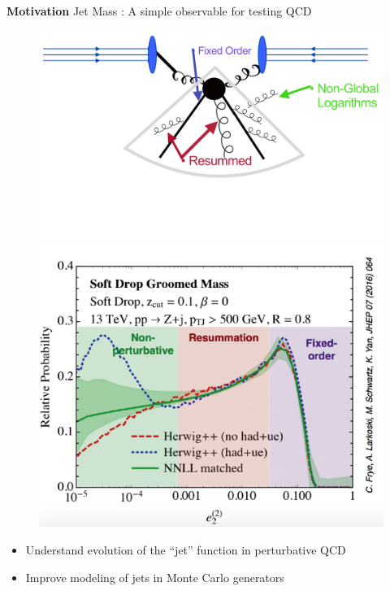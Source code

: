 \documentclass{beamer}
\begin{document}
\begin{frame}{\textbf{Motivation}}
\vspace{.9mm}
\centering
Jet Mass : A simple observable for testing QCD
\begin{figure}
\centering
\includegraphics[scale=.27]{jet.png}
\includegraphics[scale=.25]{jetcalc.png}
\end{figure}
\begin{itemize}

\item Understand evolution of the “jet” function in perturbative QCD
\item Improve modeling of jets in Monte Carlo generators

\end{itemize}


\end{frame}
\end{document}
